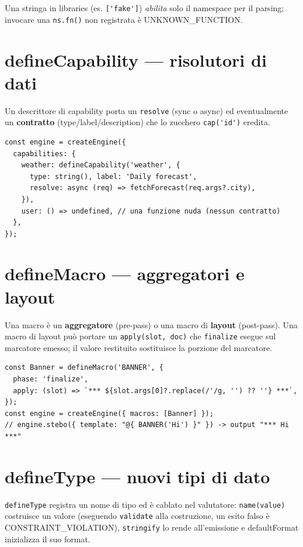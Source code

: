 \documentclass[11pt,a4paper]{book}
\let\code\lstinline
\newcommand{\ic}[1]{{\ttfamily #1}}
\theoremstyle{definition}
\begin{document}
{{{{Una stringa in \ic{libraries} (es. \code|['fake']|) \emph{abilita} solo il
namespace per il parsing; invocare una \code|ns.fn()| non registrata è
\ic{UNKNOWN\_FUNCTION}.

\section{defineCapability --- risolutori di dati}

Un descrittore di capability porta un \code|resolve| (sync o async) ed
eventualmente un \textbf{contratto} (\ic{type}/\ic{label}/\ic{description}) che lo
zucchero \code|cap('id')| eredita.

\begin{lstlisting}
const engine = createEngine({
  capabilities: {
    weather: defineCapability('weather', {
      type: string(), label: 'Daily forecast',
      resolve: async (req) => fetchForecast(req.args?.city),
    }),
    user: () => undefined, // una funzione nuda (nessun contratto)
  },
});
\end{lstlisting}

\section{defineMacro --- aggregatori e layout}

Una macro è un \textbf{aggregatore} (pre-pass) o una macro di \textbf{layout}
(post-pass). Una macro di layout può portare un \code|apply(slot, doc)| che
\code|finalize| esegue sul marcatore emesso; il valore restituito sostituisce la
porzione del marcatore.

\begin{lstlisting}
const Banner = defineMacro('BANNER', {
  phase: 'finalize',
  apply: (slot) => `*** ${slot.args[0]?.replace(/'/g, '') ?? ''} ***`,
});
const engine = createEngine({ macros: [Banner] });
// engine.stebo({ template: "@{ BANNER('Hi') }" }) -> output "*** Hi ***"
\end{lstlisting}

\section{defineType --- nuovi tipi di dato}

\code|defineType| registra un nome di tipo ed è cablato nel valutatore:
\code|name(value)| costruisce un valore (eseguendo \code|validate| alla costruzione,
un esito falso è \ic{CONSTRAINT\_VIOLATION}), \code|stringify| lo rende all'emissione
e \ic{defaultFormat} inizializza il suo \ic{format}.

}}}}
\end{document}
